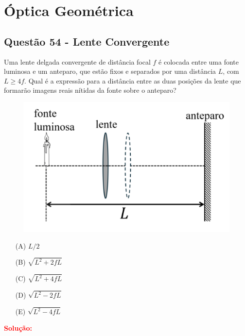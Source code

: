 \documentclass[a4paper,12pt]{article}
\begin{document}
\section{\'Optica Geométrica}
\begin{flushleft}
\subsection{Quest\~ao 54 - Lente Convergente}

Uma lente delgada convergente de distância focal $f$ é colocada entre uma fonte luminosa e um anteparo, 
que estão fixos e separados por uma distância $L$, com $L \geq 4f$. Qual é a expressão para a distância entre 
as duas posições da lente que formarão imagens reais nítidas da fonte sobre o anteparo?

\begin{figure}[!h]
  \centering
  \includegraphics[scale=0.6]{figures/optica_geometrica_lente.png}
\end{figure}

\begin{itemize}
\item[(A)] $L/2$
\item[(B)] $\sqrt{L^{2}+2fL}$
\item[(C)] $\sqrt{L^{2}+4fL}$
\item[(D)] $\sqrt{L^{2}-2fL}$
\item[(E)] $\sqrt{L^{2}-4fL}$
\end{itemize}

\vspace{0.5cm}

\textcolor{red}{\textbf{Solução:}}\\


\end{flushleft}
\end{document}
